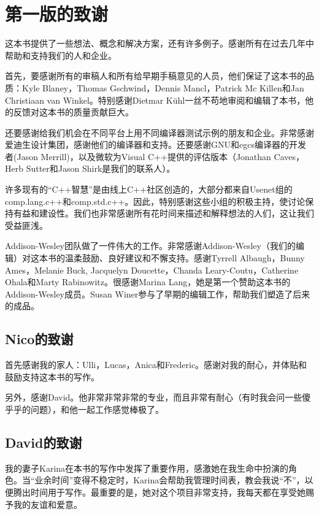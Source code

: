 \chapter{第一版的致谢}

这本书提供了一些想法、概念和解决方案，还有许多例子。感谢所有在过去几年中帮助和支持我们的人和企业。

首先，要感谢所有的审稿人和所有给早期手稿意见的人员，他们保证了这本书的品质：Kyle Blaney，Thomas Gschwind，Dennis Mancl，Patrick Mc Killen和Jan Christiaan van Winkel。特别感谢Dietmar K{\"u}hl一丝不苟地审阅和编辑了本书，他的反馈对这本书的质量贡献巨大。

还要感谢给我们机会在不同平台上用不同编译器测试示例的朋友和企业。非常感谢爱迪生设计集团，感谢他们的编译器和支持。还要感谢GNU和egcs编译器的开发者(Jason Merrill)，以及微软为Visual C++提供的评估版本（Jonathan Caves，Herb Sutter和Jason Shirk是我们的联系人）。

许多现有的“C++智慧”是由线上C++社区创造的，大部分都来自Usenet组的comp.lang.c++和comp.std.c++。因此，特别感谢这些小组的积极主持，使讨论保持有益和建设性。我们也非常感谢所有花时间来描述和解释想法的人们，这让我们受益匪浅。

Addison-Wesley团队做了一件伟大的工作。非常感谢Addison-Wesley（我们的编辑）对这本书的温柔鼓励、良好建议和不懈支持。感谢Tyrrell Albaugh，Bunny Ames，Melanie Buck, Jacquelyn Doucette，Chanda Leary-Coutu，Catherine Ohala和Marty Rabinowitz。很感谢Marina Lang，她是第一个赞助这本书的Addison-Wesley成员。Susan Winer参与了早期的编辑工作，帮助我们塑造了后来的成品。

\section{Nico的致谢}

首先感谢我的家人：Ulli，Lucas，Anica和Frederic。感谢对我的耐心，并体贴和鼓励支持这本书的写作。

另外，感谢David。他非常非常非常的专业，而且非常有耐心（有时我会问一些傻乎乎的问题），和他一起工作感觉棒极了。

\section{David的致谢}

我的妻子Karina在本书的写作中发挥了重要作用，感激她在我生命中扮演的角色。当“业余时间”变得不稳定时，Karina会帮助我管理时间表，教会我说“不”，以便腾出时间用于写作。最重要的是，她对这个项目非常支持，我每天都在享受她赐予我的友谊和爱意。

